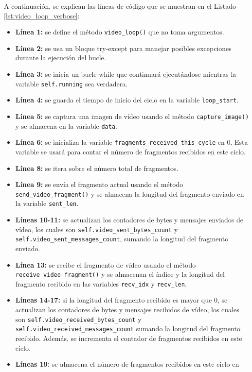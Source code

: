 A continuación, se explican las líneas de código que se muestran en el Listado \ref{lst:video_loop_verbose}:
\begin{itemize}
    \item \textbf{Línea 1:} se define el método \texttt{video\_loop()} que no toma argumentos.
    \item \textbf{Línea 2:} se usa un bloque try-except para manejar posibles excepciones durante la ejecución del bucle.
    \item \textbf{Línea 3:} se inicia un bucle while que continuará ejecutándose mientras la variable \texttt{self.running} sea verdadera.
    \item \textbf{Línea 4:} se guarda el tiempo de inicio del ciclo en la variable \texttt{loop\_start}.
    \item \textbf{Línea 5:} se captura una imagen de vídeo usando el método \texttt{capture\_image()} y se almacena en la variable \texttt{data}.
    \item \textbf{Línea 6:} se inicializa la variable \texttt{fragments\_received\_this\_cycle} en 0. Esta variable se usará para contar el número de fragmentos recibidos en este ciclo.
    \item \textbf{Línea 8:} se itera sobre el número total de fragmentos.
    \item \textbf{Línea 9:} se envía el fragmento actual usando el método \texttt{send\_video\_fragment()} y se almacena la longitud del fragmento enviado en la variable \texttt{sent\_len}.
    \item \textbf{Líneas 10-11:} se actualizan los contadores de bytes y mensajes enviados de vídeo, los cuales son \texttt{self.video\_sent\_bytes\_count} y \texttt{self.video\_sent\_messages\_count}, sumando la longitud del fragmento enviado.
    \item \textbf{Línea 13:} se recibe el fragmento de vídeo usando el método \texttt{receive\_video\_fragment()} y se almacenan el índice y la longitud del fragmento recibido en las variables \texttt{recv\_idx} y \texttt{recv\_len}.
    \item \textbf{Líneas 14-17:} si la longitud del fragmento recibido es mayor que 0, se actualizan los contadores de bytes y mensajes recibidos de vídeo, los cuales son \texttt{self.video\_received\_bytes\_count} y \texttt{self.video\_received\_messages\_count} sumando la longitud del fragmento recibido. Además, se incrementa el contador de fragmentos recibidos en este ciclo.
    \item \textbf{Líneas 19:} se almacena el número de fragmentos recibidos en este ciclo en \\

\end{itemize}
